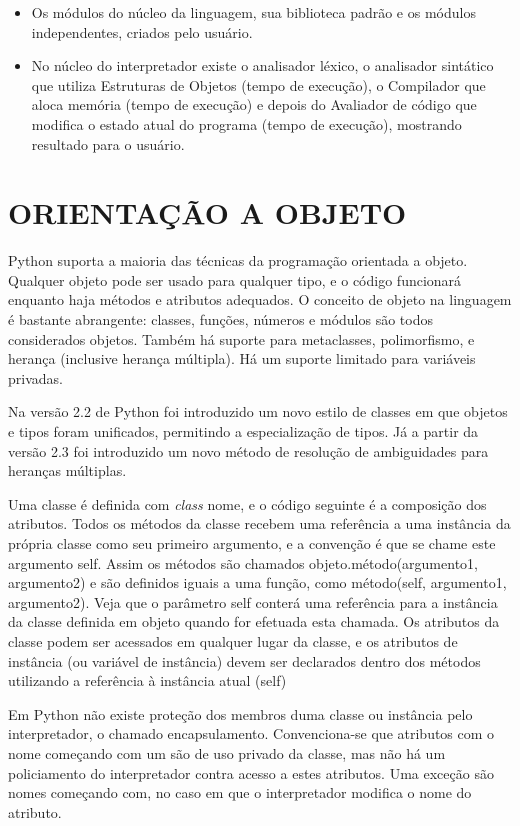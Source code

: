 \begin{itemize}
    \item Os módulos do núcleo da linguagem, sua biblioteca padrão e os módulos independentes, criados pelo usuário.
    \item No núcleo do interpretador existe o analisador léxico, o analisador sintático que utiliza Estruturas de Objetos (tempo de execução), o Compilador que aloca memória (tempo de execução) e depois do Avaliador de código que modifica o estado atual do programa (tempo de execução), mostrando resultado para o usuário.
\end{itemize}

\section{ORIENTAÇÃO A OBJETO}
Python suporta a maioria das técnicas da programação orientada a objeto.
Qualquer objeto pode ser usado para qualquer tipo, e o código funcionará enquanto haja métodos e atributos adequados.
O conceito de objeto na linguagem é bastante abrangente: classes, funções, números e módulos são todos considerados objetos.
Também há suporte para metaclasses, polimorfismo, e herança (inclusive herança múltipla).
Há um suporte limitado para variáveis privadas.

\par Na versão 2.2 de Python foi introduzido um novo estilo de classes em que objetos e tipos foram unificados, permitindo a especialização de tipos.
Já a partir da versão 2.3 foi introduzido um novo método de resolução de ambiguidades para heranças múltiplas.\cite{30}

Uma classe é definida com \textit{class} nome, e o código seguinte é a composição dos atributos.
Todos os métodos da classe recebem uma referência a uma instância da própria classe como seu primeiro argumento, e a convenção é que se chame este argumento self.
Assim os métodos são chamados objeto.método(argumento1, argumento2) e são definidos iguais a uma função, como método(self, argumento1, argumento2).
Veja que o parâmetro self conterá uma referência para a instância da classe definida em objeto quando for efetuada esta chamada.
Os atributos da classe podem ser acessados em qualquer lugar da classe, e os atributos de instância (ou variável de instância) devem ser declarados dentro dos métodos utilizando a referência à instância atual (self)

Em Python não existe proteção dos membros duma classe ou instância pelo interpretador, o chamado encapsulamento.
Convenciona-se que atributos com o nome começando com um são de uso privado da classe, mas não há um policiamento do interpretador contra acesso a estes atributos.
Uma exceção são nomes começando com, no caso em que o interpretador modifica o nome do atributo.

